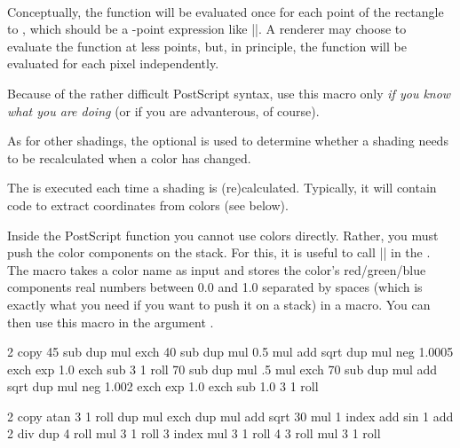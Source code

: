 \begin{command}{\pgfdeclarefunctionalshading{}\\
    }
  Conceptually, the function will be evaluated once for each point of
  the rectangle  to ,
  which should be a \pgfname-point expression like
  |\pgfpoint{100bp}{100bp}|. A renderer may choose to evaluate the
  function at less points, but, in principle, the function will be
  evaluated for each pixel independently. 

  Because of the rather difficult PostScript syntax, use this macro
  only \emph{if you know what you are doing} (or if you are
  advanterous, of course). 

  As for other shadings, the optional  is used to
  determine whether a shading needs to be recalculated when a color
  has changed.

  The  is executed each time a shading is
  (re)calculated. Typically, it will contain code to extract
  coordinates from colors (see below).

  Inside the PostScript function  you cannot use
  colors directly. Rather, you must push the color components on the
  stack. For this, it is useful to call |\pgfshadecolorrgb| in the
  . The macro takes a color name as input and stores
  the color's red/green/blue components real numbers between 0.0 and
  1.0 separated by spaces (which is exactly what you need if you want
  to push it on a stack) in a macro. You can then use this macro in
  the argument .

\begin{codeexample}[]
    {\pgfpointorigin}{\pgfpoint{4cm}{4cm}}{}{
  2 copy
  45 sub dup mul exch
  40 sub dup mul 0.5 mul add sqrt
  dup mul neg 1.0005 exch exp 1.0 exch sub
  3 1 roll
  70 sub dup mul .5 mul exch
  70 sub dup mul add sqrt
  dup mul neg 1.002 exch exp 1.0 exch sub
  1.0 3 1 roll
}
\end{codeexample}

\begin{codeexample}[]
{\pgfpoint{1cm}{1cm}}{}{
  2 copy        %
  atan
  3 1 roll
  dup mul exch
  dup mul add sqrt
  30 mul
  1 index add
  sin
  1 add 2 div  
  dup
   4 roll      %
  mul
  3 1 roll
  3 index
  mul
  3 1 roll
  4 3 roll
  mul
  3 1 roll
}
%
%
%
\end{codeexample}
\end{command}


